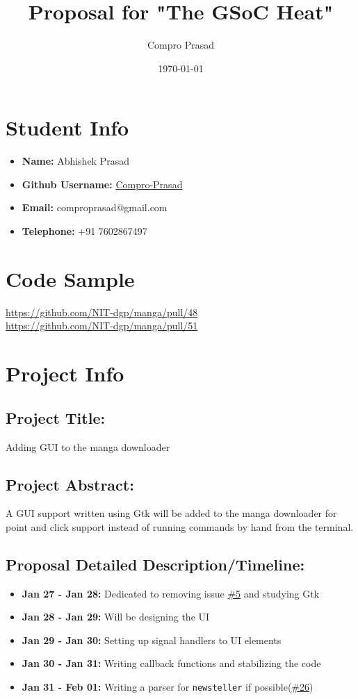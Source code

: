 \documentclass[11pt]{article}
\author{Compro Prasad}
\date{\today}
\title{Proposal for "The GSoC Heat"}
\begin{document}
\maketitle

\section{Student Info}
\label{sec:orgb3fef3f}
\begin{itemize}
\item \textbf{Name:} Abhishek Prasad
\item \textbf{Github Username:} \href{https://github.com/Compro-Prasad}{Compro-Prasad}
\item \textbf{Email:} comproprasad@gmail.com
\item \textbf{Telephone:} +91 7602867497
\end{itemize}

\section{Code Sample}
\label{sec:orgcc1ef0d}

\url{https://github.com/NIT-dgp/manga/pull/48}\\
\url{https://github.com/NIT-dgp/manga/pull/51}

\section{Project Info}
\label{sec:org5d548a8}

\subsection{Project Title:}
\label{sec:org3b8f3d6}
Adding GUI to the manga downloader

\subsection{Project Abstract:}
\label{sec:org4a0b607}
A GUI support written using Gtk will be added to the manga downloader
for point and click support instead of running commands by hand from
the terminal.

\subsection{Proposal Detailed Description/Timeline:}
\label{sec:org64bf0e2}
\begin{itemize}
\item \textbf{Jan 27 - Jan 28:} Dedicated to removing issue \href{https://github.com/NIT-dgp/manga/issues/5}{\#5} and studying Gtk
\item \textbf{Jan 28 - Jan 29:} Will be designing the UI
\item \textbf{Jan 29 - Jan 30:} Setting up signal handlers to UI elements
\item \textbf{Jan 30 - Jan 31:} Writing callback functions and stabilizing the code
\item \textbf{Jan 31 - Feb 01:} Writing a parser for \texttt{newsteller} if possible(\href{https://github.com/NIT-dgp/manga/issues/26}{\#26})
\end{itemize}
\end{document}
